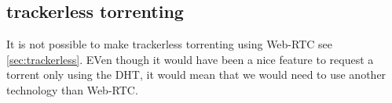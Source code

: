 \subsection{trackerless torrenting}
It is not possible to make trackerless torrenting using Web-RTC see \ref{sec:trackerless}. EVen though it would have been a nice feature to request a torrent only using the \acs{DHT}, it would mean that we would need to use another technology than Web-RTC. 


